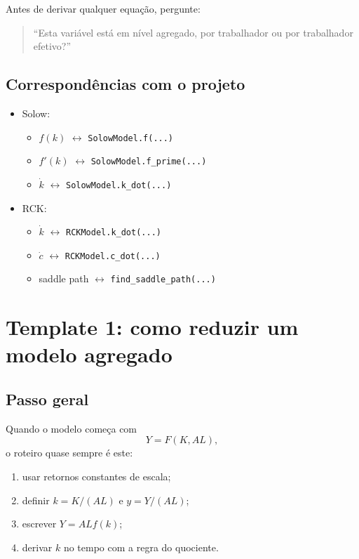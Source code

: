 \documentclass[11pt,a4paper]{article}
\begin{document}
\begin{resultado}
Antes de derivar qualquer equa\c{c}\~ao, pergunte:
\begin{quote}
``Esta vari\'avel est\'a em n\'ivel agregado, por trabalhador ou por trabalhador
efetivo?''
\end{quote}
\end{resultado}

\subsection{Correspond\^encias com o projeto}

\begin{itemize}
  \item Solow:
  \begin{itemize}
    \item \(f(k)\) \(\leftrightarrow\) \texttt{SolowModel.f(...)}
    \item \(f'(k)\) \(\leftrightarrow\) \texttt{SolowModel.f\_prime(...)}
    \item \(\dot{k}\) \(\leftrightarrow\) \texttt{SolowModel.k\_dot(...)}
  \end{itemize}
  \item RCK:
  \begin{itemize}
    \item \(\dot{k}\) \(\leftrightarrow\) \texttt{RCKModel.k\_dot(...)}
    \item \(\dot{c}\) \(\leftrightarrow\) \texttt{RCKModel.c\_dot(...)}
    \item saddle path \(\leftrightarrow\) \texttt{find\_saddle\_path(...)}
  \end{itemize}
\end{itemize}

\section{Template 1: como reduzir um modelo agregado}

\subsection{Passo geral}

Quando o modelo come\c{c}a com
\[
Y=F(K,AL),
\]
o roteiro quase sempre \'e este:
\begin{enumerate}
  \item usar retornos constantes de escala;
  \item definir \(k=K/(AL)\) e \(y=Y/(AL)\);
  \item escrever \(Y=ALf(k)\);
  \item derivar \(k\) no tempo com a regra do quociente.
\end{enumerate}
\end{document}
